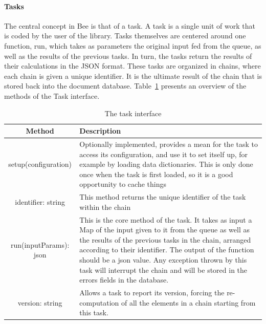 \paragraph{Tasks} %
\label{par:tasks}

The central concept in Bee is that of a task. A task is a single unit of work that is coded by the user of the library.  Tasks themselves are centered around one function, run, which takes as parameters the original input fed from the queue, as well as the results of the previous tasks. In turn, the tasks return the results of their calculations in the JSON format. These tasks are organized in chains, where each chain is given a unique identifier. It is the ultimate result of the chain that is stored back into the document database. Table~\ref{tab:task_interface} presents an overview of the methods of the Task interface.

\begin{table}
  \caption{The task interface}
  \label{tab:task_interface}
  
  \begin{center}
    \begin{tabular}{c | p{10cm} }
      Method & Description\\
      \hline
      setup(configuration) & Optionally implemented, provides a mean for the task to access its configuration, and use it to set itself up, for example by loading data dictionaries. This is only done once when the task is first loaded, so it is a good opportunity to cache things\\
      identifier: string & This method returns the unique identifier of the task within the chain\\
      run(inputParams): json & This is the core method of the task. It takes as input a Map of the input given to it from the queue as well as the results of the previous tasks in the chain, arranged according to their identifier. The output of the function should be a json value. Any exception thrown by this task will interrupt the chain and will be stored in the errors fields in the database.\\
      version: string & Allows a task to report its version, forcing the re-computation of all the elements in a chain starting from this task.\\
    \end{tabular}
  \end{center}
\end{table}


